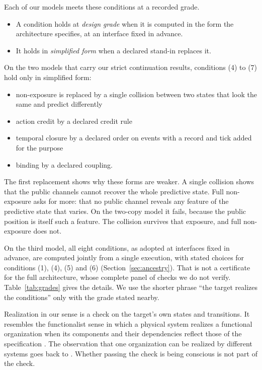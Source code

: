 Each of our models meets these conditions at a recorded grade.
\begin{itemize}
\item A condition holds at \emph{design grade} when it is computed in the form
the architecture specifies, at an interface fixed in advance.
\item It holds in \emph{simplified form} when a declared stand-in replaces it.
\end{itemize}
On the two models that carry our strict continuation results, conditions (4)
to (7) hold only in simplified form:
\begin{itemize}
\item non-exposure is replaced by a single collision between two states that
look the same and predict differently
\item action credit by a declared credit rule
\item temporal closure by a declared order on events with a record and tick
added for the purpose
\item binding by a declared coupling.
\end{itemize}
The first replacement shows why these forms are weaker. A single collision
shows that the public channels cannot recover the whole predictive state.
Full non-exposure asks for more: that no public channel reveals any feature of
the predictive state that varies. On the two-copy model it fails, because the
public position is itself such a feature. The collision survives that
exposure, and full non-exposure does not.

On the third model, all eight conditions, as adopted at interfaces fixed in
advance, are computed jointly from a single execution, with stated choices for
conditions (1), (4), (5) and (6) (Section~\ref{sec:ancestry}). That is not a
certificate for the full architecture, whose complete panel of checks we do not
verify. Table~\ref{tab:grades} gives the details. We use the shorter phrase ``the target realizes the conditions'' only
with the grade stated nearby.

Realization in our sense is a check on the target's own states and
transitions. It resembles the functionalist sense in which a physical system
realizes a functional organization when its components and their dependencies
reflect those of the specification \citep{Chalmers1995Qualia}. The observation
that one organization can be realized by different systems goes back to
\citet{Putnam1967}. Whether passing the check is being conscious is not part
of the check.

